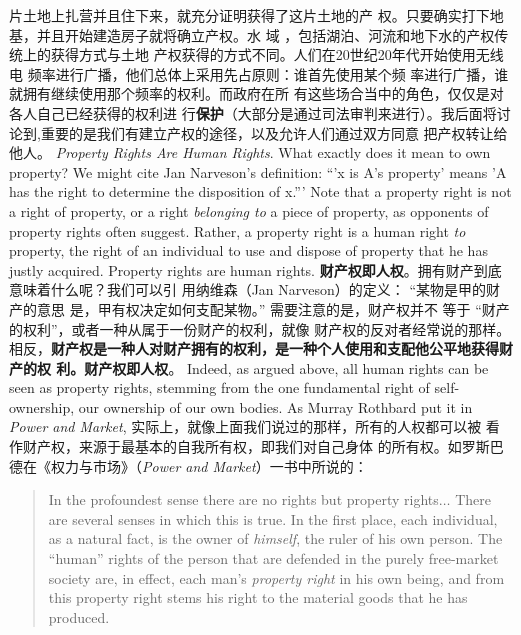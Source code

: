 \begin{paracol}{2}
片土地上扎营并且住下来，就充分证明获得了这片土地的产
权。只要确实打下地基，并且开始建造房子就将确立产权。水
域 ，包括湖泊、河流和地下水的产权传统上的获得方式与土地
产权获得的方式不同。人们在20世纪20年代开始使用无线电
频率进行广播，他们总体上采用先占原则：谁首先使用某个频
率进行广播，谁就拥有继续使用那个频率的权利。而政府在所
有这些场合当中的角色，仅仅是对各人自己已经获得的权利进
行\textbf{保护}（大部分是通过司法审判来进行）。我后面将讨论到,重要的是我们有建立产权的途径，以及允许人们通过双方同意
把产权转让给他人。  
\switchcolumn*
\textit{Property Rights Are Human Rights}. What exactly does it mean to
own property? We might cite Jan Narveson's definition: ``'x is
A's property' means 'A has the right to determine the disposition of x.''' Note that a property right is not a right of property, or a right \textit{belonging to} a piece of property, as opponents of property rights often suggest. Rather, a property right is a human right \textit{to} property, the right of an individual to use and dispose of property that he has justly acquired. Property rights are human rights.
\switchcolumn
\textbf{财产权即人权}。拥有财产到底意味着什么呢？我们可以引
用纳维森（Jan Narveson）的定义： “某物是甲的财产的意思
是，甲有权决定如何支配某物。” 需要注意的是，财产权并不
等于 “财产的权利”，或者一种从属于一份财产的权利，就像
财产权的反对者经常说的那样。相反，\textbf{财产权是一种人对财产拥有的权利，是一种个人使用和支配他公平地获得财产的权
利。财产权即人权}。
\switchcolumn*
Indeed, as argued above, all human rights can be seen as
property rights, stemming from the one fundamental right of
self-ownership, our ownership of our own bodies. As Murray
Rothbard put it in \textit{Power and Market},
\switchcolumn
实际上，就像上面我们说过的那样，所有的人权都可以被
看作财产权，来源于最基本的自我所有权，即我们对自己身体
的所有权。如罗斯巴德在《权力与市场》（\textit{Power and Market}）一书中所说的：

\switchcolumn*
\begin{quotation}
In the profoundest sense there are no rights but property
rights$\ldots$ There are several senses in which this is true. In the
first place, each individual, as a natural fact, is the owner of \textit{himself}, the ruler of his own person. The ``human'' rights of the person that are defended in the purely free-market society are, in effect,
each man's \textit{property right} in his own being, and from this property
right stems his right to the material goods that he has produced.



\end{quotation}
\end{paracol}

